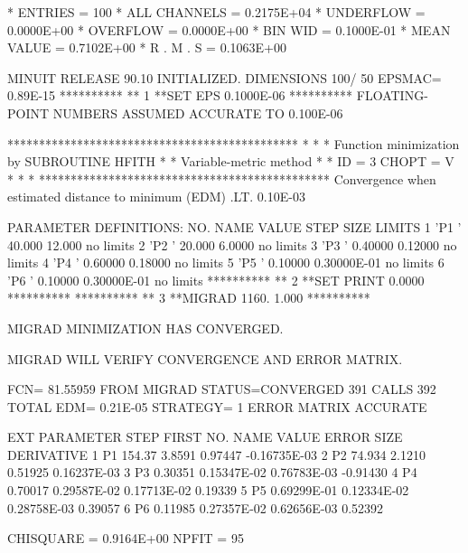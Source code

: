 \begin{Listing}
 * ENTRIES =        100      * ALL CHANNELS = 0.2175E+04      * UNDERFLOW = 0.0000E+00      * OVERFLOW = 0.0000E+00
 * BIN WID = 0.1000E-01      * MEAN VALUE   = 0.7102E+00      * R . M . S = 0.1063E+00
\newpage
{\scriptsize
  MINUIT RELEASE 90.10  INITIALIZED.   DIMENSIONS 100/ 50  EPSMAC=  0.89E-15
 **********
 **    1 **SET EPS  0.1000E-06
 **********
 FLOATING-POINT NUMBERS ASSUMED ACCURATE TO   0.100E-06

     **********************************************
     *                                            *
     * Function minimization by SUBROUTINE HFITH  *
     * Variable-metric method                     *
     * ID =          3  CHOPT = V                 *
     *                                            *
     **********************************************
 Convergence when estimated distance to minimum (EDM) .LT.  0.10E-03

 PARAMETER DEFINITIONS:
    NO.   NAME         VALUE      STEP SIZE      LIMITS
     1 'P1        '    40.000       12.000         no limits
     2 'P2        '    20.000       6.0000         no limits
     3 'P3        '   0.40000      0.12000         no limits
     4 'P4        '   0.60000      0.18000         no limits
     5 'P5        '   0.10000      0.30000E-01     no limits
     6 'P6        '   0.10000      0.30000E-01     no limits
 **********
 **    2 **SET PRINT  0.0000    
 **********
 **********
 **    3 **MIGRAD   1160.       1.000    
 **********

 MIGRAD MINIMIZATION HAS CONVERGED.

 MIGRAD WILL VERIFY CONVERGENCE AND ERROR MATRIX.

 FCN=   81.55959     FROM MIGRAD    STATUS=CONVERGED    391 CALLS      392 TOTAL
                     EDM=  0.21E-05    STRATEGY= 1      ERROR MATRIX ACCURATE 

  EXT PARAMETER                                   STEP         FIRST   
  NO.   NAME        VALUE          ERROR          SIZE      DERIVATIVE 
   1      P1        154.37        3.8591       0.97447      -0.16735E-03
   2      P2        74.934        2.1210       0.51925       0.16237E-03
   3      P3       0.30351       0.15347E-02   0.76783E-03  -0.91430    
   4      P4       0.70017       0.29587E-02   0.17713E-02   0.19339    
   5      P5       0.69299E-01   0.12334E-02   0.28758E-03   0.39057    
   6      P6       0.11985       0.27357E-02   0.62656E-03   0.52392    

 CHISQUARE = 0.9164E+00  NPFIT =   95
}
\newpage
 

\end{Listing}
